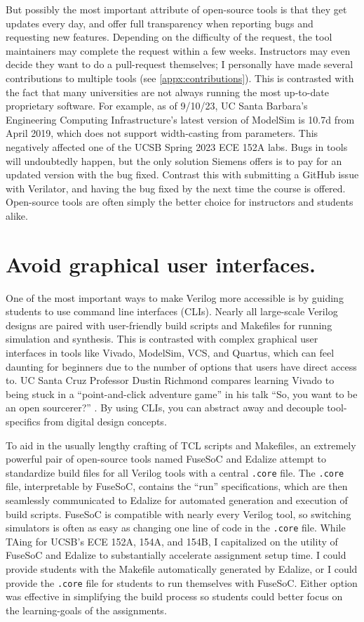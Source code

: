 But possibly the most important attribute of open-source tools is that they get updates every day, and offer full transparency when reporting bugs and requesting new features.
Depending on the difficulty of the request, the tool maintainers may complete the request within a few weeks.
Instructors may even decide they want to do a pull-request themselves; I personally have made several contributions to multiple tools (see \autoref{appx:contributions}).
This is contrasted with the fact that many universities are not always running the most up-to-date proprietary software.
For example, as of 9/10/23, UC Santa Barbara's Engineering Computing Infrastructure's latest version of ModelSim is 10.7d from April 2019, which does not support width-casting from parameters.
This negatively affected one of the UCSB Spring 2023 ECE 152A labs.
Bugs in tools will undoubtedly happen, but the only solution Siemens offers is to pay for an updated version with the bug fixed.
Contrast this with submitting a GitHub issue with Verilator, and having the bug fixed by the next time the course is offered.
Open-source tools are often simply the better choice for instructors and students alike.

\section{Avoid graphical user interfaces.}

One of the most important ways to make Verilog more accessible is by guiding students to use command line interfaces (CLIs).
Nearly all large-scale Verilog designs are paired with user-friendly build scripts and Makefiles for running simulation and synthesis.
This is contrasted with complex graphical user interfaces in tools like Vivado, ModelSim, VCS, and Quartus, which can feel daunting for beginners due to the number of options that users have direct access to.
UC Santa Cruz Professor Dustin Richmond compares learning Vivado to being stuck in a \enquote{point-and-click adventure game} in his talk \enquote{So, you want to be an open sourcerer?} \cite{RichmondLatchUp}.
By using CLIs, you can abstract away and decouple tool-specifics from digital design concepts.

To aid in the usually lengthy crafting of TCL scripts and Makefiles, an extremely powerful pair of open-source tools named FuseSoC and Edalize \cite{fusesocGitHub, edalizeGitHub} attempt to standardize build files for all Verilog tools with a central \texttt{.core} file.
The \texttt{.core} file, interpretable by FuseSoC, contains the \enquote{run} specifications, which are then seamlessly communicated to Edalize for automated generation and execution of build scripts.
FuseSoC is compatible with nearly every Verilog tool, so switching simulators is often as easy as changing one line of code in the \texttt{.core} file.
While TAing for UCSB's ECE 152A, 154A, and 154B, I capitalized on the utility of FuseSoC and Edalize to substantially accelerate assignment setup time.
I could provide students with the Makefile automatically generated by Edalize, or I could provide the \texttt{.core} file for students to run themselves with FuseSoC.
Either option was effective in simplifying the build process so students could better focus on the learning-goals of the assignments.
